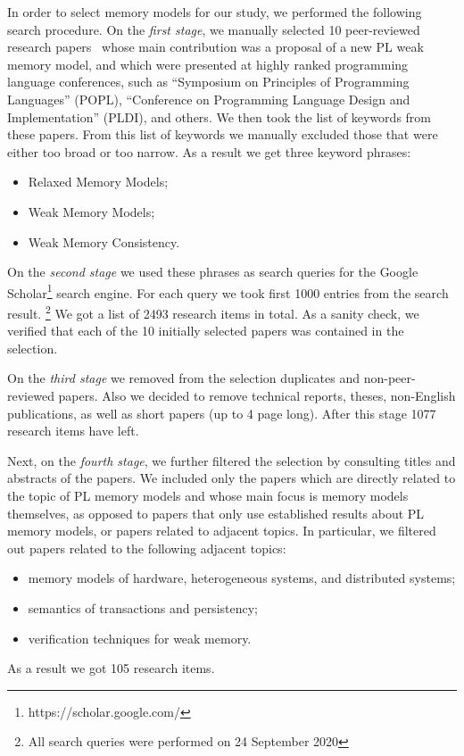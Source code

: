 In order to select memory models for our study, 
we performed the following search procedure.
On the \emph{first stage}, we manually selected 10  
peer-reviewed research papers~\cite{
Manson-al:POPL05,
Batty-al:POPL11,
Lahav-al:PLDI17,
Dolan-al:PLDI18,
Watt-al:PLDI2020,
Jeffrey-Riely:LICS16,
PichonPharabod-Sewell:POPL16,
Kang-al:POPL17,
Chakraborty-Vafeiadis:POPL19,
Paviotti-al:ESOP20
}
whose main contribution was a proposal of a new PL weak memory model, 
and which were presented at highly ranked programming language conferences, 
such as ``Symposium on Principles of Programming Languages'' (POPL),
``Conference on Programming Language Design and Implementation'' (PLDI), and others.
We then took the list of keywords from these papers. 
From this list of keywords we manually excluded those 
that were either too broad or too narrow.
As a result we get three keyword phrases:
\begin{itemize}
  \item Relaxed Memory Models;
  \item Weak Memory Models;
  \item Weak Memory Consistency.
\end{itemize}
 
On the \emph{second stage} we used these phrases as search queries
for the Google Scholar\footnote{https://scholar.google.com/} search engine.
For each query we took first 1000 entries from the search result.%
\footnote{All search queries were performed on 24 September 2020}
We got a list of 2493 research items in total. 
As a sanity check, we verified that each of the 10 initially 
selected papers was contained in the selection. 

On the \emph{third stage} we removed from the selection duplicates
and non-peer-reviewed papers. 
Also we decided to remove technical reports, theses, 
non-English publications, as well as short papers (up to 4 page long).
After this stage 1077 research items have left.

Next, on the \emph{fourth stage}, we further filtered the selection 
by consulting titles and abstracts of the papers. 
We included only the papers which are directly related to the 
topic of PL memory models and whose main focus is memory models themselves,
as opposed to papers that only use established results about PL memory models,
or papers related to adjacent topics. 
In particular, we filtered out papers related to the following adjacent topics:
\begin{itemize}
  \item memory models of hardware, heterogeneous systems, and distributed systems;
  \item semantics of transactions and persistency;
  \item verification techniques for weak memory.
\end{itemize}
As a result we got 105 research items.

